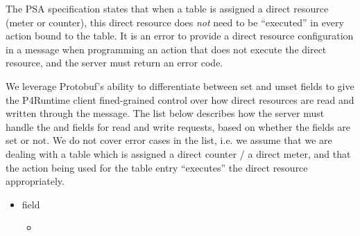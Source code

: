 \documentclass[11pt]{article}
\begin{document}
{%
The PSA specification states that when a table is assigned a direct resource
(meter or counter), this direct resource does \emph{not} need to be \textquotedblleft{}executed\textquotedblright{} in
every action bound to the table. It is an error to provide a direct resource
configuration in a  message when programming an action that does not
execute the direct resource, and the server must return an 
error code.%

We leverage Protobuf's ability to differentiate between set and unset fields to
give the P4Runtime client fined-grained control over how direct resources are
read and written through the  message. The list below describes how
the server must handle the  and  fields for read and
write requests, based on whether the fields are set or not. We do not cover
error cases in the list, i.e. we assume that we are dealing with a table which
is assigned a direct counter / a direct meter, and that the action being used
for the table entry \textquotedblleft{}executes\textquotedblright{} the direct resource appropriately.%

\begin{itemize}%

\item{}
 field%

\begin{itemize}[noitemsep,topsep=\mdcompacttopsep]%

\item{}

\begin{itemize}[noitemsep,topsep=\mdcompacttopsep]%


\end{itemize}
\end{itemize}
\end{itemize}}
\end{document}
